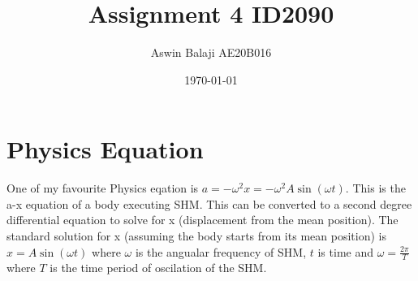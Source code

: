 \documentclass{article}
\title{Assignment 4 ID2090}
\author{Aswin Balaji AE20B016}
\date{\today}
\begin{document}
	\maketitle

	\section{Physics Equation}

	One of my favourite Physics eqation is $a = - \omega ^2 x = - \omega ^2 A\sin (\omega t)$. This is the a-x equation of a body executing SHM. This can be converted to a second degree differential equation to solve for x (displacement from the mean position). The standard solution for x (assuming the body starts from its mean position) is $x=A\sin (\omega t)$ where $\omega$ is the angualar frequency of SHM, $t$ is time and $\omega = {\frac{2\pi}{T}}$ where $T$ is the time period of oscilation of the SHM. 
\end{document}
